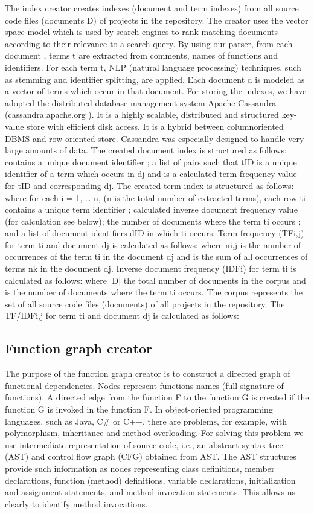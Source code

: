 \documentclass{llncs}
\begin{document}
The index creator creates indexes (document and term indexes) from all source code
files (documents D) of projects in the repository. The creator uses the vector space
model which is used by search engines to rank matching documents according to their
relevance to a search query. By using our parser, from each document , terms t
are extracted from comments, names of functions and identifiers. For each term t,
NLP (natural language processing) techniques, such as stemming and identifier splitting,
are applied. Each document d is modeled as a vector of terms which occur in that
document.
For storing the indexes, we have adopted the distributed database management system
Apache Cassandra (cassandra.apache.org ). It is a highly scalable, distributed and
structured key-value store with efficient disk access. It is a hybrid between columnoriented
DBMS and row-oriented store. Cassandra was especially designed to handle
very large amounts of data. The created document index is structured as follows:
contains a unique document identifier ; a list of pairs such that tID is a unique
identifier of a term which occurs in dj and is a calculated term frequency value
for tID and corresponding dj.
The created term index is structured as follows: where for each i = 1, … n, (n is the total number of extracted terms), each row ti contains
a unique term identifier ; calculated inverse document frequency value
(for calculation see below); the number of documents where the term ti occurs ;
and a list of document identifiers dID in which ti occurs.
Term frequency (TFi,j) for term ti and document dj is calculated as follows: where ni,j is the number of occurrences of the term ti in the document dj and  is
the sum of all occurrences of terms nk in the document dj.
Inverse document frequency (IDFi) for term ti is calculated as follows: where |D| the total number of documents in the corpus and is the number
of documents where the term ti occurs. The corpus represents the set of all source
code files (documents) of all projects in the repository.
The TF/IDFi,j for term ti and document dj is calculated as follows:
\subsection{Function graph creator}

The purpose of the function graph creator is to construct a directed graph of functional
dependencies. Nodes represent functions names (full signature of functions). A
directed edge from the function F to the function G is created if the function G is
invoked in the function F. In object-oriented programming languages, such as Java,
C\# or C++, there are problems, for example, with polymorphism, inheritance and
method overloading. For solving this problem we use intermediate representation of
source code, i.e., an abstract syntax tree (AST) and control flow graph (CFG) obtained
from AST. The AST structures provide such information as nodes representing
class definitions, member declarations, function (method) definitions, variable declarations,
initialization and assignment statements, and method invocation statements.
This allows us clearly to identify method invocations.
\end{document}
